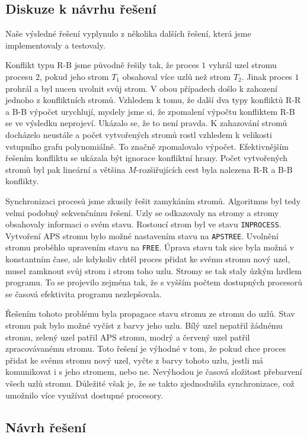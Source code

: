 \documentclass[a4paper, 11pt, titlepage, final]{article}[3. prosinec 2011]
\begin{document}
\subsection{Diskuze k návrhu řešení}

Naše výsledné řešení vyplynulo z několika dalších řešení, která jsme implementovaly a testovaly. 

Konflikt typu R-B jsme původně řešily tak, že proces $1$ vyhrál uzel stromu procesu $2$, pokud jeho strom $T_1$ obsahoval více uzlů než strom $T_2$. Jinak proces $1$ prohrál a byl nucen uvolnit svůj strom. V obou případech došlo k zahození jednoho z konfliktních stromů. Vzhledem k tomu, že další dva typy konfliktů R-R a B-B výpočet urychlují, myslely jsme si, že zpomalení výpočtu konfliktem R-B se ve výsledku neprojeví. Ukázalo se, že to není pravda. K zahazování stromů docházelo neustále a počet vytvořených stromů rostl vzhledem k velikosti vstupního grafu polynomiálně. To značně zpomalovalo výpočet. Efektivnějším řešením konfliktu se ukázala být ignorace konfliktní hrany. Počet vytvořených stromů byl pak lineární a většina $M$-rozšiřujících cest byla nalezena R-R a B-B konflikty.

Synchronizaci procesů jsme zkusily řešit zamykáním stromů. Algoritmus byl tedy velmi podobný sekvenčnímu řešení. Uzly se odkazovaly na stromy a stromy obsahovaly informaci o svém stavu. Rostoucí strom byl ve stavu \texttt{INPROCESS}. Vytvoření APS stromu bylo možné nastavením stavu na \texttt{APSTREE}. Uvolnění stromu proběhlo upravením stavu na \texttt{FREE}. Úprava stavu tak sice byla možná v konstantním čase, ale kdykoliv chtěl proces přidat ke svému stromu nový uzel, musel zamknout svůj strom i strom toho uzlu. Stromy se tak staly úzkým hrdlem programu. To se projevilo zejména tak, že s vyšším počtem dostupných procesorů se časová efektivita programu nezlepšovala.

Řešením tohoto problému byla propagace stavu stromu ze stromu do uzlů. Stav stromu pak bylo možné vyčíst z barvy jeho uzlu. Bílý uzel nepatřil žádnému stromu, zelený uzel patřil APS stromu, modrý a červený uzel patřil zpracovávanému stromu. Toto řešení je výhodné v tom, že pokud chce proces přidat ke svému stromu nový uzel, vyčte z barvy tohoto uzlu, jestli má komunikovat i s jeho stromem, nebo ne. Nevýhodou je časová složitost přebarvení všech uzlů stromu. Důležité však je, že se takto zjednodušila synchronizace, což umožnilo více využívat dostupné procesory.

\subsection{Návrh řešení}
\end{document}
